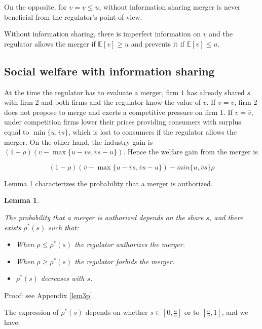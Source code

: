 \documentclass[a4paper,leqno]{article}%
\newtheorem{lemma}{Lemma}
\newcommand{\E}{\mathbb E}
\newcommand{\uv}{\underline{v}}
\newcommand{\ov}{\overline{v}}
\begin{document}
On the opposite, for $v=\uv\leq u$, without information sharing merger is never beneficial from the regulator's point of view.

Without information sharing, there is imperfect information on $v$ and the regulator allows the merger if $\E[v]\geq u$ and prevents it if $\E[v]\leq u$.

\medskip

\subsection{Social welfare with information sharing}

\medskip

At the time the regulator has to evaluate a merger, firm $1$ has already shared $s$ with firm $2$ and both firms and the regulator know the value of $v$. If $v=\uv$, firm 2 does not propose to merge and exerts a competitive pressure on firm 1. If $v=\ov$, under competition firms lower their prices providing consumers with surplus equal to $\min\{u,\ov s\}$, which is lost to consumers if the regulator allows the merger. On the other hand, the industry gain is $(1-\rho) (\ov-\max\{u-\ov s,\ov s-u\})$. Hence the welfare gain from the merger is

%

\[
(1-\rho) (\ov-\max\{u-\ov s,\ov s-u\})-min\{u,\ov s\}\rho
\]

Lemma \ref{lem3} characterizes the probability that a merger is authorized.

\begin{lemma}~~\label{lem3}

The probability that a merger is authorized depends on the share $s$, and there exists $\rho^*(s)$ such that:

\begin{itemize}
    \item When $\rho\leq \rho^*(s)$ the regulator authorizes the merger.
    \item When $\rho\geq \rho^*(s)$ the regulator forbids the merger.
    \item $\rho^*(s)$ decreases with $s$.
\end{itemize}

\end{lemma}

\noindent Proof: see Appendix \ref{lem3p}.

\noindent The expression of $\rho^*(s)$ depends on whether $s\in[0,\frac{u}{\ov}]$ or to $[\frac{u}{\ov},1]$, and we have: 
\end{document}
